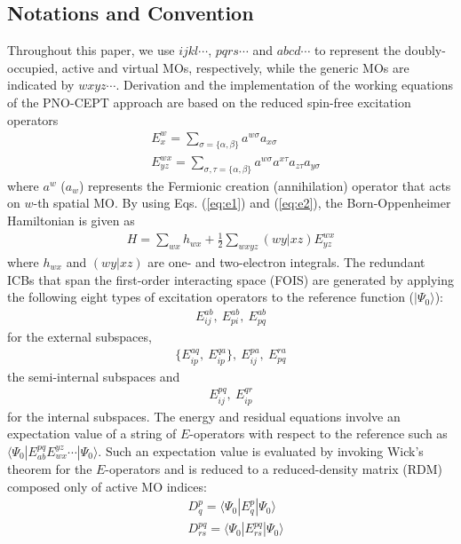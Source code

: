 \documentclass[aip,jcp,amsmath,twocolumn,floatfix,reprint,fleqn]{revtex4-1}
\begin{document}
\subsection{Notations and Convention}
%
Throughout this paper, we use $ijkl\cdots$, $pqrs\cdots$ and $abcd\cdots$ to represent the doubly-occupied, active and virtual MOs, respectively, while the generic MOs are indicated by $wxyz\cdots$.
%
Derivation and the implementation of the working equations of the PNO-CEPT approach are based on the reduced spin-free excitation operators\cite{PhysRevA.43.3392,PhysRevA.41.2391,doi:10.1063/1.448859,Kutzelnigg_Mukherjee1997}
%
\begin{align}
  &E^w_x = \sum_{\sigma=\{\alpha,\beta\}} a^{w\sigma}a_{x\sigma} \label{eq:e1} \\
  &E^{wx}_{yz} = \sum_{\sigma,\tau=\{\alpha,\beta\}} a^{w\sigma}a^{x\tau}a_{z\tau}a_{y\sigma} \label{eq:e2}
\end{align}
%
where $a^{w}$ ($a_w$) represents the Fermionic creation (annihilation) operator that acts on $w$-th spatial MO.
%
By using Eqs. (\ref{eq:e1}) and (\ref{eq:e2}), the Born-Oppenheimer Hamiltonian is given as
\begin{align}
  H=\sum_{wx} h_{wx} + \frac{1}{2}\sum_{wxyz} (wy|xz) E^{wx}_{yz}
\end{align}
%
where $h_{wx}$ and $(wy|xz)$ are one- and two-electron integrals.
%
The redundant ICBs that span the first-order interacting space (FOIS) are generated by applying the following eight types of excitation operators to the reference function ($|\Psi_0\rangle$):
%
\begin{align}
  E_{ij}^{ab},\ E_{pi}^{ab},\ E_{pq}^{ab} \label{eq:externalICB}
\end{align}
%
for the external subspaces,
%
\begin{align}
  \{E_{ip}^{aq},\ E_{ip}^{qa}\},\ E_{ij}^{pa},\ E_{pq}^{ra}
\end{align}
%
the semi-internal subspaces and
%
\begin{align}
  E_{ij}^{pq},\ E_{ip}^{qr}
\end{align}
%
for the internal subspaces.
%
The energy and residual equations involve an expectation value of a string of $E$-operators with respect to the reference such as $\langle\Psi_0|E^{pq}_{ab}E_{wx}^{yz}\cdots|\Psi_0\rangle$.
%
Such an expectation value is evaluated by invoking Wick's theorem for the $E$-operators and is reduced to a reduced-density matrix (RDM) composed only of active MO indices:
%
\begin{align}
  &D^{p}_{q} = \langle\Psi_0|E^{p}_{q}|\Psi_0\rangle  \\
  &D^{pq}_{rs} = \langle\Psi_0|E^{pq}_{rs}|\Psi_0\rangle
\end{align}
\end{document}
